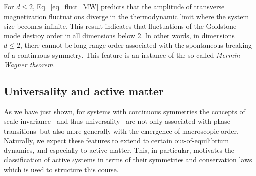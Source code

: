 %

For $d \le 2$, Eq.~\eqref{eq_fluct_MW} predicts that the amplitude of transverse magnetization fluctuations diverge in the thermodynamic limit where the system size becomes infinite.
This result indicates that fluctuations of the Goldstone mode destroy order in all dimensions below 2. 
In other words, in dimensions $d \leq 2$, there cannot be long-range order associated with the spontaneous breaking of a continuous symmetry.
This feature is an instance of the so-called \emph{Mermin-Wagner theorem}.

\subsection{Universality and active matter}

As we have just shown, for systems with continuous symmetries the concepts of scale invariance --and thus universality-- are not only associated with phase transitions, but also more generally with the emergence of macroscopic order.
Naturally, we expect these features to extend to certain out-of-equilibrium dynamics, and especially to active matter.
This, in particular, motivates the classification of active systems in terms of their symmetries and conservation laws which is used to structure this course.

